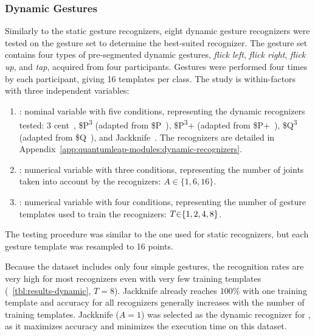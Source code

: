 \subsubsection{Dynamic Gestures}
Similarly to the static gesture recognizers, eight dynamic gesture recognizers were tested on the \lui gesture set to determine the best-suited recognizer. The gesture set contains four types of pre-segmented dynamic gestures, \ie \textit{flick left}, \textit{flick right}, \textit{flick up}, and \textit{tap}, acquired from four participants. Gestures were performed four times by each participant, giving 16 templates per class. The study is within-factors with three independent variables: 
\begin{enumerate}
    \item {}: nominal variable with five conditions, representing the dynamic recognizers tested:  3 cent~\cite{Caputo:2017}, \$P\textsuperscript{3} (adapted from \$P~\cite{Vatavu:2012}), \$P\textsuperscript{3}+ (adapted from \$P+~\cite{Vatavu:2017a}), \$Q\textsuperscript{3} (adapted from \$Q~\cite{Vatavu:2018}), and Jackknife~\cite{Taranta:2017}. The recognizers are detailed in Appendix~\ref{app:quantumleap-modules:dynamic-recognizers}.
    \item {}: numerical variable with three conditions, representing the number of joints taken into account by the recognizers: $A{\in}\{1, 6, 16\}$.
    \item {}: numerical variable with four conditions, representing the number of gesture templates used to train the recognizers: $\splitatcommas{T{\in}\{1,2,4,8\}}$.
\end{enumerate}
The testing procedure was similar to the one used for static recognizers, but each gesture template was resampled to 16 points.

Because the dataset includes only four simple gestures, the recognition rates are very high for most recognizers even with very few training templates (\tab~\ref{tbl:results-dynamic}, $T{=}8$). Jackknife already reaches $100\%$ with one training template and accuracy for all recognizers generally increases with the number of training templates. %
Jackknife ($A{=}1$) was selected as the dynamic recognizer for \lui, as it maximizes accuracy and minimizes the execution time on this dataset.

